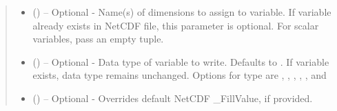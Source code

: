 \documentclass[a4paper,10pt,openany,english]{sphinxmanual}
\begin{document}
\begin{fulllineitems}
\begin{fulllineitems}
\begin{quote}
\begin{description}
\begin{itemize}
\item {} 
 () -- Optional - Name(s) of dimensions to assign to variable. If variable already exists
in NetCDF file, this parameter is optional. For scalar variables, pass an empty tuple.

\item {} 
 () -- Optional - Data type of variable to write. Defaults to . If variable exists,
data type remains unchanged. Options for type are , , , 
, , and 

\item {} 
 () -- Optional - Overrides default NetCDF \_FillValue, if provided.

\end{itemize}

\end{description}\end{quote}

\end{fulllineitems}


\end{fulllineitems}

\end{document}
